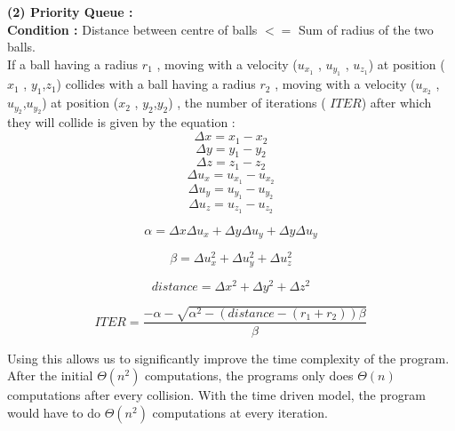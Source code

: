 \documentclass[a4paper]{article}
\begin{document}
\textbf{(2) Priority Queue  : }\\
\textbf{Condition : }Distance between centre of balls $<=$ Sum of radius of the two balls.\\
If a ball having a radius $r_1$ , moving with a velocity ($u_{x_1}$ , $u_{y_1}$ , $u_{z_1}$) at position ($x_1$ , $y_1$,$z_1$) collides with a ball having a radius $r_2$ , moving with a velocity ($u_{x_2} $ , $u_{y_2}$,$u_{y_2}$) at position ($x_2$ , $y_2$,$y_2$) , the number of iterations ( $ITER$) after which they will collide is given by the equation : \\
\begin{equation}
\Delta x = x_1 - x_2
\end{equation}
\begin{equation}
\Delta y = y_1 - y_2
\end{equation}
\begin{equation}
\Delta z = z_1 - z_2
\end{equation}
\begin{equation}
\Delta u_x = u_{x_1} - u_{x_2}
\end{equation}
\begin{equation}
\Delta u_y = u_{y_1} - u_{y_2}
\end{equation}
\begin{equation}
\Delta u_z = u_{z_1} - u_{z_2}
\end{equation}

\begin{equation}
\alpha = \Delta x\Delta u_x + \Delta y\Delta u_y +\Delta y\Delta u_y
\end{equation}

\begin{equation}
\beta = \Delta u_x^2 + \Delta u_y^2 + \Delta u_z^2
\end{equation}

\begin{equation}
distance = \Delta x^2 + \Delta y^2 +  \Delta z^2
\end{equation}

\begin{equation}
ITER = \frac{-\alpha - \sqrt{\alpha^2 -(distance - (r_1 + r_2))\beta}}{\beta}
\end{equation}

Using this allows us to significantly improve the time complexity of the program. After the initial $\Theta(n^2)$ computations, the programs only does $\Theta(n)$ computations after every collision. With the time driven model, the program would have to do $\Theta(n^2)$ computations at every iteration.\\
\end{document}
